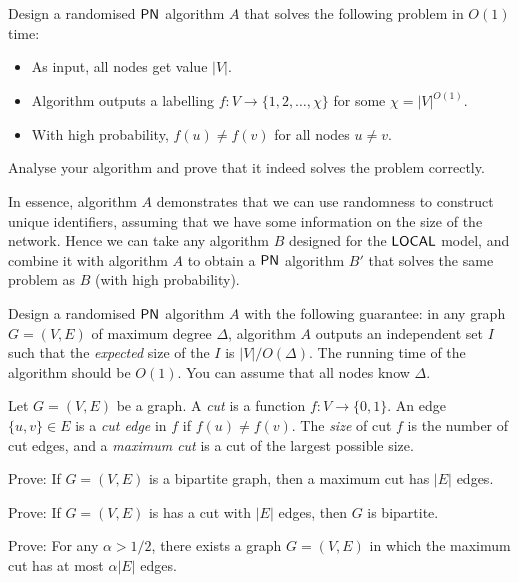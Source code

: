 \begin{ex}
    Design a randomised $\textup{\sffamily PN}$ algorithm $A$ that solves the following problem in $O(1)$ time:
    \begin{itemize}[noitemsep]
        \item As input, all nodes get value $|V|$.
        \item Algorithm outputs a labelling $f\colon V \to \{1,2,\dotsc,\chi\}$ for some $\chi = |V|^{O(1)}$.
        \item With high probability, $f(u) \ne f(v)$ for all nodes $u \ne v$.
    \end{itemize}
    Analyse your algorithm and prove that it indeed solves the problem correctly.

    In essence, algorithm $A$ demonstrates that we can use randomness to construct unique identifiers, assuming that we have some information on the size of the network. Hence we can take any algorithm $B$ designed for the $\textup{\sffamily LOCAL}$ model, and combine it with algorithm $A$ to obtain a $\textup{\sffamily PN}$ algorithm $B'$ that solves the same problem as $B$ (with high probability).
\end{ex}

\begin{ex}
    Design a randomised $\textup{\sffamily PN}$ algorithm $A$ with the following guarantee: in any graph $G = (V,E)$ of maximum degree $\Delta$, algorithm $A$ outputs an independent set $I$ such that the \emph{expected} size of the $I$ is $|V|/O(\Delta)$. The running time of the algorithm should be $O(1)$. You can assume that all nodes know $\Delta$.
\end{ex}

\begin{ex}
    Let $G = (V,E)$ be a graph. A \emph{cut} is a function $f\colon V \to \{0,1\}$. An edge $\{u,v\} \in E$ is a \emph{cut edge} in $f$ if $f(u) \ne f(v)$. The \emph{size} of cut $f$ is the number of cut edges, and a \emph{maximum cut} is a cut of the largest possible size.
    \begin{subex}
        \item Prove: If $G = (V,E)$ is a bipartite graph, then a maximum cut has $|E|$ edges.
        \item Prove: If $G = (V,E)$ is has a cut with $|E|$ edges, then $G$ is bipartite.
        \item Prove: For any $\alpha > 1/2$, there exists a graph $G = (V,E)$ in which the maximum cut has at most $\alpha |E|$ edges.
    \end{subex}
\end{ex}

